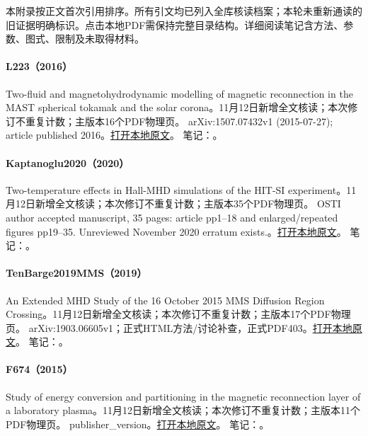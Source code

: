本附录按正文首次引用排序。所有引文均已列入全库核读档案；本轮未重新通读的旧证据明确标识。点击本地PDF需保持完整目录结构。详细阅读笔记含方法、参数、图式、限制及未取得材料。

\paragraph{L223（2016）}\label{paper:L223}
Two-fluid and magnetohydrodynamic modelling of magnetic reconnection in the MAST spherical tokamak and the solar corona。11月12日新增全文核读；本次修订不重复计数；主版本16个PDF物理页。
arXiv:1507.07432v1 (2015-07-27); article published 2016。\href{run:../../papers/L223.pdf}{打开本地原文}。
笔记：。\par\smallskip
\paragraph{Kaptanoglu2020（2020）}\label{paper:Kaptanoglu2020}
Two-temperature effects in Hall-MHD simulations of the HIT-SI experiment。11月12日新增全文核读；本次修订不重复计数；主版本35个PDF物理页。
OSTI author accepted manuscript, 35 pages: article pp1–18 and enlarged/repeated figures pp19–35. Unreviewed November 2020 erratum exists.。\href{run:../../papers/Kaptanoglu2020_accepted.pdf}{打开本地原文}。
笔记：。\par\smallskip
\paragraph{TenBarge2019MMS（2019）}\label{paper:TenBarge2019MMS}
An Extended MHD Study of the 16 October 2015 MMS Diffusion Region Crossing。11月12日新增全文核读；本次修订不重复计数；主版本17个PDF物理页。
arXiv:1903.06605v1；正式HTML方法/讨论补查，正式PDF403。\href{run:../../papers/TenBarge2019MMS.pdf}{打开本地原文}。
笔记：。\par\smallskip
\paragraph{F674（2015）}\label{paper:F674}
Study of energy conversion and partitioning in the magnetic reconnection layer of a laboratory plasma。11月12日新增全文核读；本次修订不重复计数；主版本11个PDF物理页。
publisher\_version。\href{run:../../papers/F674_published.pdf}{打开本地原文}。
笔记：。\par\smallskip

